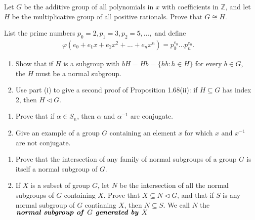 \documentclass[15pt]{article}
\newenvironment{exercise}[2][Exercise]{\begin{trivlist}
\item[\hskip \labelsep {\bfseries #1}\hskip \labelsep {\bfseries #2.}]}
{\end{trivlist}}
\newenvironment{hint}[2][Hint]{\begin{trivlist}
    \item[\hskip \labelsep {\bfseries #1}\hskip \labelsep {\bfseries #2.}]}
    {\end{trivlist}}
\begin{document}
\begin{exercise}{1.56}
    Let $G$ be the additive group of all polynomials in $x$ with coefficients in $\mathbb Z$, and let
    $H$ be the multiplicative group of all positive rationals. Prove that $G \cong H$.

    \begin{hint}{}
        List the prime numbers $p_0=2, p_1=3, p_2=5,...,$ and define
        \begin{align*}
            \varphi(e_0+e_1x+e_2x^2+...+e_nx^n) = p_0^{e_0}...p_n^{e_n}.
        \end{align*}
    \end{hint}
    
\end{exercise}



\begin{exercise}{1.57}
    \begin{enumerate}
        \item[(i)] Show that if $H$ is a subgroup with $bH=Hb=\{hb: h\in H\}$ for every $b\in G$, the $H$ must be 
        a normal subgroup.
        \item[(ii)] Use part (i) to give a second proof of Proposition 1.68(ii): if $H \subseteq G$ has index 2, then $H\lhd G$.
    \end{enumerate}
\end{exercise}


\begin{exercise}{1.58}
    \begin{enumerate}
        \item[(i)] Prove that if $\alpha \in S_n$, then $\alpha$ and $\alpha^{-1}$ are conjugate.
        \item[(ii)] Give an example of a group $G$ containing an element $x$ for which $x$ and $x^{-1}$ are not conjugate.
    \end{enumerate}
\end{exercise}


\begin{exercise}{1.59}
    \begin{enumerate}
        \item[(i)] Prove that the intersection of any family of normal subgroups of a group $G$ is itself a normal subgroup of $G$.
        \item[(ii)] If $X$ is a subset of group $G$, let $N$ be the intersection of all the normal subgroups of $G$ containing $X$. 
        Prove that $X\subseteq N \lhd G$, and that if $S$ is any normal subgroup of $G$ contianing $X$, then $N\subseteq S$.
        We call $N$ the $\textbf{\textit{normal subgroup of }} G \textbf{\textit{ generated by }} X$ 
    \end{enumerate}
\end{exercise}
\end{document}
